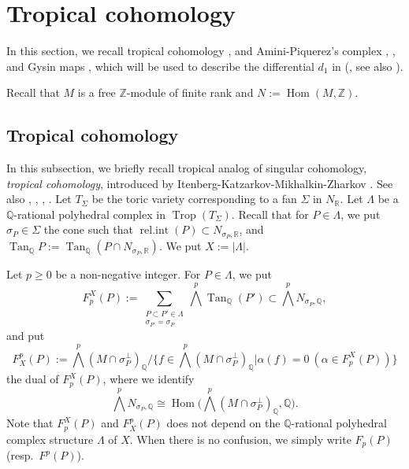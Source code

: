 \documentclass[12pt,a4]{amsart}
\def\R{\mathbb{R}}
\def\Z{\mathbb{Z}}
\def\Q{\mathbb{Q}}
\def\Tan{\mathop{\mathrm{Tan}}\nolimits}
\def\Trop{\mathop{\mathrm{trop}}\nolimits}
\def\relint{\mathop{\mathrm{rel.int}}\nolimits}
\def\Hom{\mathop{\mathrm{Hom}}\nolimits}
\def\Trop{\mathop{\mathrm{Trop}}\nolimits}
\numberwithin{equation}{section}
\numberwithin{figure}{section}
\begin{document}
\section{Tropical cohomology}\label{sec:tropical_cohomology}
  In this section, we recall tropical cohomology \cite{ItenbergKatzarkovMikhalkinZharkovTropicalhomology2019}, 
   and Amini-Piquerez's complex \cite{AminiPiquerezHomologyoftropicalfans2021}, \cite{AminiPiquerezTropicalFeichtner-Yuzvinskyandpositivitycriterionforfans2024}, 
   and Gysin maps \cite{AminiPiquerezHodgetheoryfortropicalvarieties2020},
   which will be used to describe     
     the differential $d_1 $ in  (, see also ). 

   Recall that 
   $M$ is a free $\Z$-module of finite rank and $N:=\Hom(M,\Z)$.

 \subsection{Tropical cohomology}\label{subsec tropical cohomology}
   In this subsection, we briefly recall tropical analog of singular cohomology, \textit{tropical cohomology}, 
    introduced by Itenberg-Katzarkov-Mikhalkin-Zharkov \cite{ItenbergKatzarkovMikhalkinZharkovTropicalhomology2019}.
  See also 
   \cite{MikhalkinZharkovTropicaleignewaveandintermediatejacobians2014},
   \cite{JellShawSmackaSuperformstropicalcohomologyandPoincarduality2019}, 
   \cite{AminiPiquerezHodgetheoryfortropicalvarieties2020}, \cite{GrossShokirehAsheaf-theoreticapproachtotropicalhomology23}.
  Let $T_{\Sigma}$ be the toric variety corresponding to a fan $\Sigma$ in $N_\R$.
  Let $\Lambda $ be a $\Q$-rational polyhedral complex in $\Trop(T_{\Sigma})$.
  Recall that
  for $P \in \Lambda$,
  we put $\sigma_P \in \Sigma$ the cone such that $\relint(P) \subset N_{\sigma_P,\R}$, 
  and $\Tan_\Q P := \Tan_\Q (P \cap N_{\sigma_P,\R})$.
  We put $X:= \lvert \Lambda \rvert$.
  
  Let $p \geq 0$ be a non-negative integer.
  For $P \in \Lambda$,
  we put 
  $$F_p^X(P):= \sum_{\substack{P \subset P' \in \Lambda
     \\ \sigma_{P'} = \sigma_P }}
      \bigwedge^p \Tan_\Q (P') \subset \bigwedge^p N_{\sigma_P,\Q},$$ 
  and  put
  $$F^p_X(P):= \bigwedge^p  (M \cap \sigma_P^{\perp} )_\Q 
  \big/ 
  \big\{f \in \bigwedge^p (M \cap \sigma_P^{\perp})_\Q 
  \big| \alpha(f)=0 \ (\alpha \in F_p^X(P))
  \big\} $$
  the dual of $F_p^X (P)$,
  where we identify $$\bigwedge^p N_{\sigma_P,\Q} \cong \Hom \big(\bigwedge^p  (M \cap \sigma_P^{\perp} )_\Q, \Q \big).$$
  Note that $F_p^X (P)$ and $F^p_X (P)$ does not depend on the $\Q$-rational polyhedral complex structure $\Lambda$ 
     of $X$. 
  When there is no confusion, we simply write $F_p(P)$ (resp.\ $F^p(P)$).
  
\end{document}
